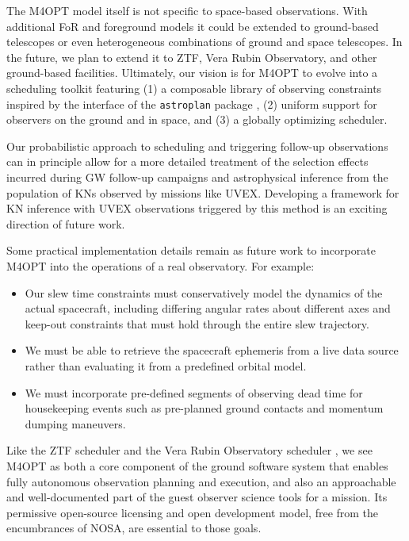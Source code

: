\documentclass[twocolumn,times]{aastex631}
\begin{document}
The \ac{M4OPT} model itself is not specific to space-based observations. With additional \ac{FoR} and foreground models it could be extended to ground-based telescopes or even heterogeneous combinations of ground and space telescopes. In the future, we plan to extend it to \ac{ZTF}, Vera Rubin Observatory, and other ground-based facilities. Ultimately, our vision is for \ac{M4OPT} to evolve into a scheduling toolkit featuring (1) a composable library of observing constraints inspired by the interface of the \texttt{astroplan} package \citep{2018AJ....155..128M}, (2) uniform support for observers on the ground and in space, and (3) a globally optimizing scheduler.

Our probabilistic approach to scheduling and triggering follow-up observations can in principle allow for a more detailed treatment of the selection effects incurred during \ac{GW} follow-up campaigns and astrophysical inference from the population of \acp{KN} observed by missions like \ac{UVEX}. Developing a framework for \ac{KN} inference with \ac{UVEX} observations triggered by this method is an exciting direction of future work.

Some practical implementation details remain as future work to incorporate \ac{M4OPT} into the operations of a real observatory. For example:
%
\begin{itemize}
\item Our slew time constraints must conservatively model the dynamics of the actual spacecraft, including differing angular rates about different axes and keep-out constraints that must hold through the entire slew trajectory.
\item We must be able to retrieve the spacecraft ephemeris from a live data source rather than evaluating it from a predefined orbital model.
\item We must incorporate pre-defined segments of observing dead time for housekeeping events such as pre-planned ground contacts and momentum dumping maneuvers.
\end{itemize}

Like the \ac{ZTF} scheduler \citep{2019PASP..131f8003B} and the Vera Rubin Observatory scheduler \citep{2019AJ....157..151N}, we see \ac{M4OPT} as both a core component of the ground software system that enables fully autonomous observation planning and execution, and also an approachable and well-documented part of the guest observer science tools for a mission. Its permissive open-source licensing and open development model, free from the encumbrances of \ac{NOSA}, are essential to those goals.
\end{document}
